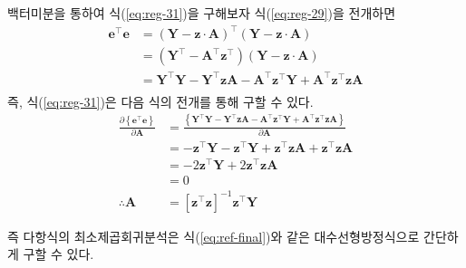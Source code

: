 {\begin{minipage}{\textwidth}
백터미분을 통하여 식(\ref{eq:reg-31})을 구해보자 식(\ref{eq:reg-29})을 전개하면
\begin{align*}
\mathbf{e}^{\top}\mathbf{e}&=(\mathbf{Y}-\mathbf{z}\cdot\mathbf{A})^{\top}(\mathbf{Y}-\mathbf{z}\cdot\mathbf{A})\\
&=(\mathbf{Y}^{\top}-\mathbf{A}^{\top}\mathbf{z}^{\top})(\mathbf{Y}-\mathbf{z}\cdot\mathbf{A})\\
&=\mathbf{Y}^{\top}\mathbf{Y}-\mathbf{Y}^{\top}\mathbf{zA}-\mathbf{A}^{\top}\mathbf{z}^{\top}\mathbf{Y}+\mathbf{A}^{\top}\mathbf{z}^{\top}\mathbf{zA}\\
\end{align*}
즉, 식(\ref{eq:reg-31})은 다음 식의 전개를 통해 구할 수 있다.
\begin{align}
\frac{\partial\left\{\mathbf{e}^{\top}\mathbf{e}\right\}}{\partial\mathbf{A}}&=\frac{\left\{\mathbf{Y}^{\top}\mathbf{Y}-\mathbf{Y}^{\top}\mathbf{zA}-\mathbf{A}^{\top}\mathbf{z}^{\top}\mathbf{Y}+\mathbf{A}^{\top}\mathbf{z}^{\top}\mathbf{zA}\right\}}{\partial\mathbf{A}}\\
&=-\mathbf{z}^{\top}\mathbf{Y}-\mathbf{z}^{\top}\mathbf{Y}+\mathbf{z}^{\top}\mathbf{zA}+\mathbf{z}^{\top}\mathbf{zA}\\
&=-2\mathbf{z}^{\top}\mathbf{Y}+2\mathbf{z}^{\top}\mathbf{zA}\\
&=0\\
\therefore \mathbf{A}&=\left[\mathbf{z}^{\top}\mathbf{z}\right]^{-1}\mathbf{z}^{\top}\mathbf{Y}\label{eq:ref-final}
\end{align}
\end{minipage}
}
즉 다항식의 최소제곱회귀분석은 식(\ref{eq:ref-final})와 같은 대수선형방정식으로 간단하게 구할 수 있다.